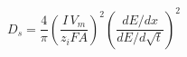 \documentclass[preview]{standalone}
\begin{document}
\[D_s = \frac{4}{\pi}\left(\frac{I\,V_m}{z_i F A}\right)^{2}\left(\frac{dE/dx}{dE/d\sqrt{t}}\right)^{2}\]
\end{document}
